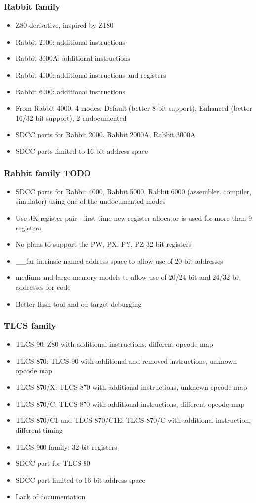 \documentclass[xcolor=dvipsnames]{beamer}
\begin{document}
\begin{frame}
	\frametitle{Rabbit family}
	\begin{itemize}
		\item Z80 derivative, inspired by Z180
		\item Rabbit 2000: additional instructions
		\item Rabbit 3000A: additional instructions
		\item Rabbit 4000: additional instructions and registers
		\item Rabbit 6000: additional instructions
		\item From Rabbit 4000: 4 modes: Default (better 8-bit support), Enhanced (better 16/32-bit support), 2 undocumented
		\item SDCC ports for Rabbit 2000, Rabbit 2000A, Rabbit 3000A
		\item SDCC ports limited to 16 bit address space
	\end{itemize}
\end{frame}

\begin{frame}
	\frametitle{Rabbit family TODO}
	\begin{itemize}
		\item SDCC ports for Rabbit 4000, Rabbit 5000, Rabbit 6000 (assembler, compiler, simulator) using one of the undocumented modes
		\item Use JK register pair - first time new register allocator is used for more than 9 registers.
		\item No plans to support the PW, PX, PY, PZ 32-bit registers
		\item \_\_far intrinsic named address space to allow use of 20-bit addresses
		\item medium and large memory models to allow use of 20/24 bit and 24/32 bit addresses for code
		\item Better flash tool and on-target debugging
	\end{itemize}
\end{frame}

\begin{frame}
	\frametitle{TLCS family}
	\begin{itemize}
		\item TLCS-90: Z80 with additional instructions, different opcode map
		\item TLCS-870: TLCS-90 with additional and removed instructions, unknown opcode map
		\item TLCS-870/X: TLCS-870 with additional instructions, unknown opcode map
		\item TLCS-870/C: TLCS-870 with additional instructions, different opcode map
		\item TLCS-870/C1 and TLCS-870/C1E: TLCS-870/C with additional instruction, different timing
		\item TLCS-900 family: 32-bit registers
		\item SDCC port for TLCS-90
		\item SDCC port limited to 16 bit address space
		\item Lack of documentation
	\end{itemize}
\end{frame}
\end{document}
